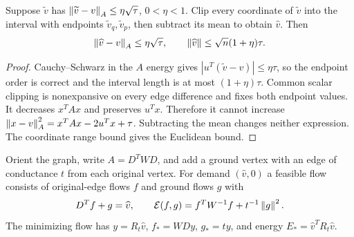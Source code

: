 \begin{lemma}
Suppose $\widetilde v$ has
$\left\lVert\widetilde v-v\right\rVert_A\le\eta\sqrt\tau$, $0<\eta<1$.
Clip every coordinate of $\widetilde v$ into the interval with endpoints
$\widetilde v_q,\widetilde v_p$, then subtract its mean to obtain
$\widehat v$. Then
\begin{equation}\label{alg:eq:clip}
 \left\lVert\widehat v-v\right\rVert_A\le\eta\sqrt\tau,\qquad
 \left\lVert\widehat v\right\rVert\le\sqrt n(1+\eta)\tau.
\end{equation}
\end{lemma}
\begin{proof}
Cauchy--Schwarz in the $A$ energy gives
$|u^T(\widetilde v-v)|\le\eta\tau$, so the endpoint order is correct
and the interval length is at most $(1+\eta)\tau$.
Common scalar clipping is nonexpansive on every edge difference and
fixes both endpoint values. It decreases $x^TAx$ and preserves $u^Tx$.
Therefore it cannot increase
$\left\lVert x-v\right\rVert_A^2=x^TAx-2u^Tx+\tau$.
Subtracting the mean changes neither expression. The coordinate range
bound gives the Euclidean bound.
\end{proof}

Orient the graph, write $A=D^TWD$, and add a ground vertex with an
edge of conductance $t$ from each original vertex. For demand
$(\widehat v,0)$ a feasible flow consists of original-edge flows $f$
and ground flows $g$ with
\[
 D^Tf+g=\widehat v,
 \qquad \mathcal E(f,g)=f^TW^{-1}f+t^{-1}\left\lVert g\right\rVert^2.
\]
The minimizing flow has $y=R_t\widehat v$,
$f_*=WDy$, $g_*=ty$, and energy
$E_*=\widehat v^TR_t\widehat v$.

